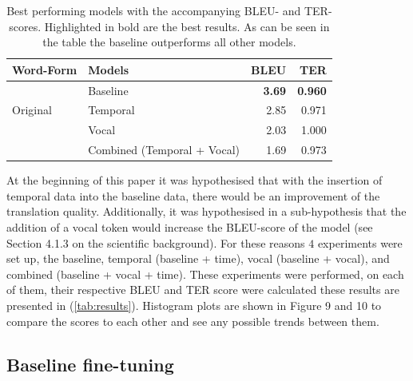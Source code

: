 \begin{table}[h]
    \caption{Best performing models with the accompanying BLEU- and TER-scores. Highlighted in bold are the best results. As can be seen in the table the baseline outperforms all other models.}
    \label{tab:results}
    \begin{tabular}{llrr}
        \toprule
                                                                  
        Word-Form                   &  Models                           &  BLEU                & TER    \\ 
        \midrule
        \multirow{3}{*}{Original}  &  Baseline                              &   \textbf{3.69}      &  \textbf{0.960} \\
                              & Temporal                                &   2.85               &  0.971 \\
                              & Vocal                                   &   2.03               &  1.000 \\
                              & Combined (Temporal + Vocal)             &   1.69               &  0.973 \\
    
        
    \end{tabular}
    
\end{table}


At the beginning of this paper it was hypothesised that with the insertion of temporal data into the baseline data, there would be an improvement of the translation quality. Additionally, it was hypothesised in a sub-hypothesis that the addition of a vocal token would increase the BLEU-score of the model (see Section 4.1.3 on the scientific background). For these reasons $4$ experiments were set up, the baseline, temporal (baseline + time), vocal (baseline + vocal), and combined (baseline + vocal + time). These experiments were performed, on each of them, their respective BLEU and TER score were calculated these results are presented in (\autoref{tab:results}). Histogram plots are shown in Figure 9 and 10 to compare the scores to each other and see any possible trends between them.

\subsection{Baseline fine-tuning}

